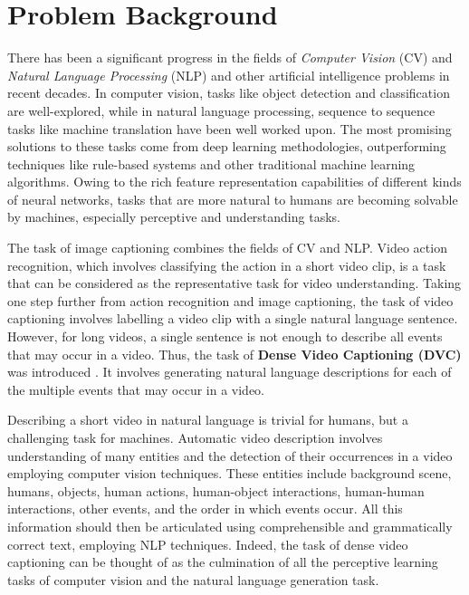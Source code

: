 \section{Problem Background}

\par There has been a significant progress in the fields of \textit{Computer Vision} (CV) and \textit{Natural Language Processing} (NLP) and other artificial intelligence problems in recent decades. In computer vision, tasks like object detection and classification are well-explored, while in natural language processing, sequence to sequence tasks like machine translation have been well worked upon. The most promising solutions to these tasks come from deep learning methodologies, outperforming techniques like rule-based systems and other traditional machine learning algorithms. Owing to the rich feature representation capabilities of different kinds of neural networks, tasks that are more natural to humans are becoming solvable by machines, especially perceptive and understanding tasks.

\par The task of image captioning combines the fields of CV and NLP. Video action recognition, which involves classifying the action in a short video clip, is a task that can be considered as the representative task for video understanding. Taking one step further from action recognition and image captioning, the task of video captioning involves labelling a video clip with a single natural language sentence. However, for long videos, a single sentence is not enough to describe all events that may occur in a video. Thus, the task of \textbf{Dense Video Captioning (DVC)} was introduced \cite{krishna2017densecaptioning}. It involves generating natural language descriptions for each of the multiple events that may occur in a video.

\par Describing a short video in natural language is trivial for humans, but a challenging task for machines. Automatic video description involves understanding of many entities and the detection of their occurrences in a video employing computer vision techniques. These entities include background scene, humans, objects, human actions, human-object interactions, human-human interactions, other events, and the order in which events occur. All this information should then be articulated using comprehensible and grammatically correct text, employing NLP techniques\cite{aafaq2020video}. Indeed, the task of dense video captioning can be thought of as the culmination of all the perceptive learning tasks of computer vision and the natural language generation task.

